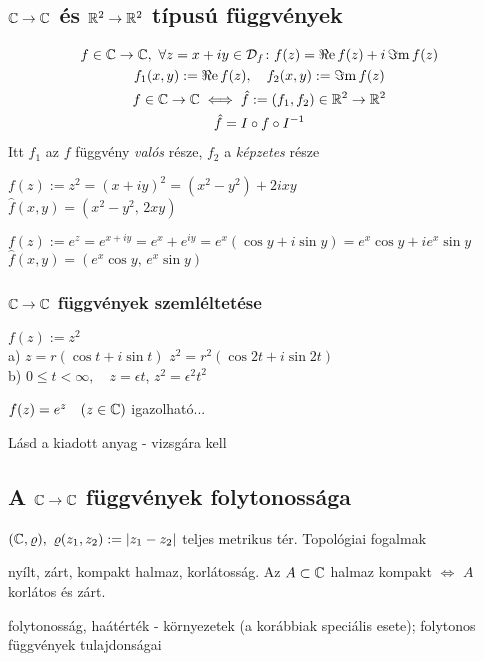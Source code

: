 \subsection{$\mathbb{C}\to\mathbb{C}$ és $\mathbb{R}^2\to\mathbb{R}^2$ típusú függvények}
\begin{gather*}
  f\in\mathbb{C}\to\mathbb{C},\ \forall z=x+iy\in \mathcal{D}_f\colon f(z) = \operatorname{\Re e} f(z) + i \operatorname{\Im m} f(z)\\
  f_1(x,y) := \operatorname{\Re e} f(z),\quad f_2(x,y) := \operatorname{\Im m} f(z)\\
  f\in \mathbb{C}\to\mathbb{C} \iff \hat{f} := (f_1,f_2)\in \mathbb{R}^2\to \mathbb{R}^2\\
  \hat{f} = I\circ f\circ I^{-1}
\end{gather*}
Itt $f_1$ az $f$ függvény \emph{valós} része, $f_2$ a \emph{képzetes} része
\begin{Pl}
  \item $f(z) := z^2 = (x+iy)^2 = (x^2-y^2)  + 2ixy$\\
    $\hat{f}(x,y) = (x^2-y^2,\, 2xy)$
  \item $f(z) := e^z = e^{x+iy}= e^x + e^{iy} = e^x(\cos y + i\sin y) = e^x \cos y + i e^x \sin y$\\
    $\hat{f}(x,y) = (e^x\cos y,\, e^x \sin y)$
\end{Pl}

\subsubsection{$\mathbb{C}\to\mathbb{C}$ függvények szemléltetése}
\begin{Pl}
  \item $f(z) := z^2$\\
    a) $ z=r(\cos t + i\sin t)$ $z^2=r^2(\cos2t + i\sin2t)$\\
    b) $0\leq t < \infty,\quad z = \epsilon t $, $z^2=\epsilon^2t^2$
  \item $f(z) = e^z\quad (z\in\mathbb{C})$ igazolható...
\end{Pl}
Lásd a kiadott anyag - vizsgára kell
\subsection{A $\mathbb{C}\to\mathbb{C}$ függvények folytonossága}
$(\mathbb{C},\varrho),\ \varrho(z_1,z_2) := |z_1 - z_2|$ teljes metrikus tér. Topológiai fogalmak

\begin{enumzjb}
  \item nyílt, zárt, kompakt halmaz, korlátosság. Az $A\subset \mathbb{C}$ halmaz kompakt $\iff$ $A$ korlátos és zárt.
  \item folytonosság, haátérték - környezetek (a korábbiak speciális esete); folytonos függvények tulajdonságai
\end{enumzjb}



